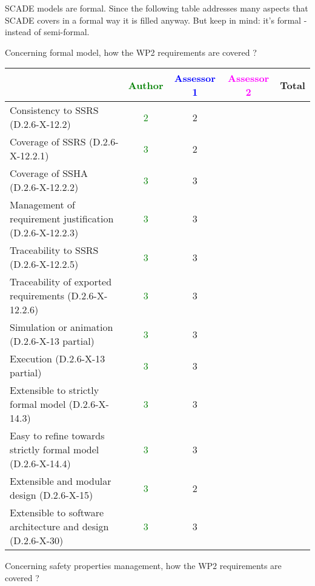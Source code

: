 \begin{author_comment}
SCADE models are formal. Since the following table addresses many aspects that SCADE covers in a formal way it is filled anyway. But keep in mind: it's formal - instead of semi-formal.  
\end{author_comment}


Concerning formal model, how the WP2 requirements are covered ?

\begin{tabular}{|l | c | c | c | c|}
\hline
& \textcolor{green}{Author} & \textcolor{blue}{Assessor 1} & \textcolor{magenta}{Assessor 2} & Total \\
\hline 
Consistency to SSRS (D.2.6-X-12.2) & \textcolor{green}{2} & 2 & &  \\
\hline
Coverage of SSRS (D.2.6-X-12.2.1)  & \textcolor{green}{3} & 2 & &  \\
\hline
Coverage of SSHA (D.2.6-X-12.2.2)  &  \textcolor{green}{3}& 3 & &  \\
\hline
Management of requirement justification (D.2.6-X-12.2.3)  &
\textcolor{green}{3}& 3 & &  \\
\hline
Traceability to  SSRS (D.2.6-X-12.2.5)  &  \textcolor{green}{3}& 3 & &  \\
\hline
Traceability of exported requirements (D.2.6-X-12.2.6)  &
\textcolor{green}{3}& 3 & &  \\
\hline
Simulation or animation (D.2.6-X-13 partial)  &  \textcolor{green}{3}&
3& &  \\
\hline
Execution (D.2.6-X-13 partial)  & \textcolor{green}{3} & 3 & &  \\
\hline
Extensible to strictly formal model (D.2.6-X-14.3) &
\textcolor{green}{3}  & 3 & &  \\
\hline
Easy to  refine towards strictly formal model (D.2.6-X-14.4) &
\textcolor{green}{3} & 3 & &  \\
\hline
Extensible and modular design (D.2.6-X-15)  & \textcolor{green}{3} & 2 & &  \\
\hline
Extensible to software architecture and design (D.2.6-X-30)   &
\textcolor{green}{3}& 3 & &  \\
\hline
\end{tabular}

Concerning safety properties management, how the WP2 requirements are covered ?

